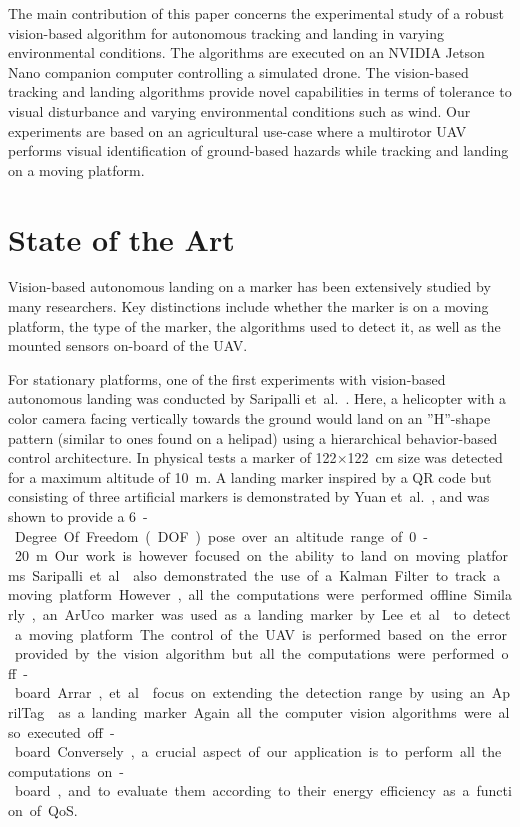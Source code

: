 \documentclass[conference, onecolumn, draftclsnofoot]{IEEEtran}
\begin{document}

The main contribution of this paper concerns the experimental study of
a robust vision-based algorithm for autonomous
tracking and landing in varying environmental conditions. The
algorithms are executed on an NVIDIA Jetson Nano companion computer
controlling a simulated drone. The vision-based tracking and landing
algorithms provide novel capabilities in terms of tolerance to visual
disturbance and varying environmental conditions such as wind.
%
Our experiments are based on an agricultural use-case where a
multirotor UAV performs visual identification of ground-based hazards
while tracking and landing on a moving platform.
%




\section{State of the Art}
\label{sec:state-of-the-art}

Vision-based autonomous landing on a marker has been extensively
studied by many researchers. Key distinctions include whether the
marker is on a moving platform, the type of the marker, the algorithms
used to detect it, as well as the mounted sensors on-board of the UAV.

For stationary platforms, one of the first experiments with
vision-based autonomous landing was conducted by Saripalli
et~al.~\cite{saripalli2002vision}. Here, a helicopter with a color
camera facing vertically towards the ground would land on an ”H”-shape
pattern (similar to ones found on a helipad) using a hierarchical
behavior-based control architecture. In physical tests a marker of
\SI{122}{}$\times$\SI{122}{\cm} size was detected for a maximum altitude of \SI{10}{\m}. A
landing marker inspired by a QR code but consisting of three
artificial markers is demonstrated by Yuan
et~al.~\cite{yuan2018hierarchical}, and was shown to provide a \SI{6}-Degree Of Freedom (DOF)
pose over an altitude range of \SI{0}{}-\SI{20}{\m}. Our work is however focused on
the ability to land on moving platforms.

Saripalli et~al.~\cite{saripalli2003landing} also demonstrated the use
of a Kalman Filter to track a moving platform. However, all the
computations were performed offline. Similarly, an ArUco marker was
used as a landing marker by Lee et~al.~\cite{lee2012autonomous} to
detect a moving platform. The control of the UAV is performed based on
the error provided by the vision algorithm but all the computations
were performed off-board. Arrar, et~al.~\cite{araar2017vision} focus
on extending the detection range by using an
AprilTag~\cite{olson2011apriltag} as a landing marker. Again all the
computer vision algorithms were also executed off-board. Conversely, a crucial
aspect of our application is to perform all the computations on-board,
and to evaluate them according to their energy efficiency as a
function of QoS.
\end{document}
